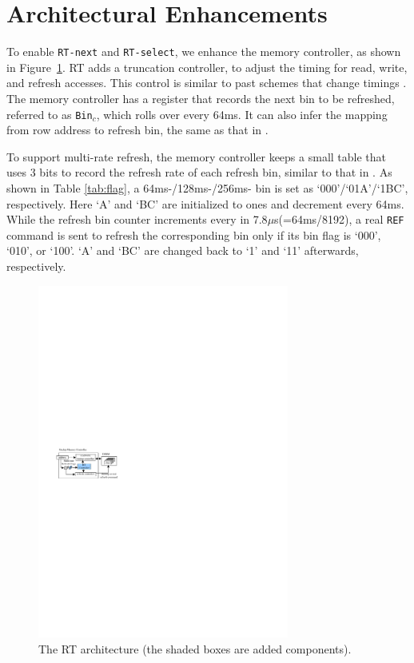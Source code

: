 \section{Architectural Enhancements}

To enable {\tt RT-next} and {\tt RT-select}, we enhance the memory controller, as shown in Figure~\ref{fig:arch}. RT adds a truncation controller, to adjust the timing for read, write, and refresh accesses. This control is similar to past schemes that change timings \cite{HPCA13:tldram, ISCA13:charm, HPCA14:nuat}.  The memory controller has a register that records the next bin to be refreshed, referred to as {\tt Bin$_c$}, which rolls over every 64ms. 
It can also infer the mapping from row address to refresh bin, the same as that in \cite{ISCA15:reflex, ISCA14:disturbance}. 

To support multi-rate refresh, the memory controller keeps a small table that uses 3 bits to record the refresh rate of each refresh bin, similar to that in \cite{ISCA12:raidr, ISCA15:reflex}. As shown in Table \ref{tab:flag}, a 64ms-/128ms-/256ms- bin is set as `000'/`01A'/`1BC', respectively. Here `A' and `BC' are initialized to ones and decrement every 64ms.
While the refresh bin counter increments every in 7.8$\mu$s(=64ms/8192), a real {\tt REF} command is sent to refresh the corresponding bin only if its bin flag is `000', `010', or `100'. 
`A' and `BC' are changed back to `1' and `11' afterwards, respectively.

\begin{figure}[htbp]
\begin{center}
\centering
\includegraphics[width=3.25in]{figures/HPCA16/rt_arch.pdf}
\vspace{-0.1in}
\caption{The RT architecture (the shaded boxes are added components).}
\label{fig:arch}
\vspace{-0.45in}
\end{center}
\end{figure}

